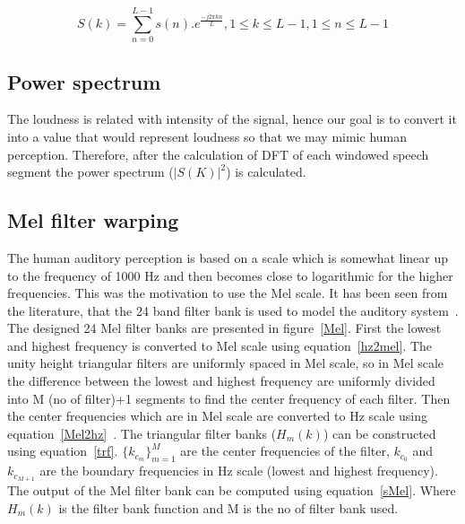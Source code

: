 \begin{spacing}{1.5}
\begin{equation}
 \label{dft}
 S(k)=\sum_{n=0}^{L-1}s(n).e^{\frac{-j2\pi kn}{L}}, 1 \leq k \leq L-1, 1 \leq n \leq L-1
\end{equation}


\subsection{Power spectrum}  The loudness is related with intensity of the signal, hence our goal is to convert it into a value that would represent loudness so that we may mimic human perception. Therefore, after the calculation of DFT of each windowed speech segment the power spectrum ($|{S(K)}|^2$) is calculated.


\subsection{Mel filter warping} The human auditory perception is based on a scale which is somewhat linear up to the frequency of 1000 Hz and then becomes close to logarithmic for the higher frequencies.  This was the motivation to use the Mel scale. It has been seen from the literature, that the 24 band filter bank is used to model the auditory system~\cite{beigi2011speaker}. The designed 24 Mel filter banks are presented in figure~\ref{Mel}. First the lowest and highest frequency is converted to Mel scale using equation~\ref{hz2mel}. The unity height triangular filters are uniformly spaced in Mel scale, so in Mel scale the difference between the lowest and highest frequency are uniformly divided into M (no of filter)+1 segments to find the center frequency of each filter. Then the center frequencies which are in Mel scale are converted to Hz scale using equation~\ref{Mel2hz}~\cite{chakroborty2009improved}. The triangular filter banks ($H_{m}(k)$) can be constructed using equation~\ref{trf}. $\{k_{c_{m}}\}_{m=1}^{M}$ are the center frequencies of the filter, $k_{c_{0}}$ and $k_{c_{M+1}}$  are the boundary frequencies in Hz scale (lowest and highest frequency). The output of the Mel filter bank can be computed using equation~\ref{sMel}. Where $H_{m}(k)$ is the filter bank function and M is the no of filter bank used.


\end{spacing}
